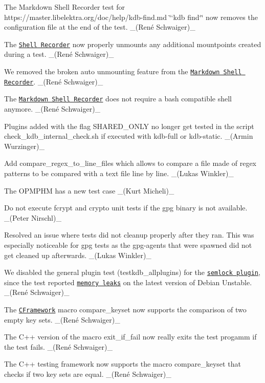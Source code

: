 \begin{DoxyItemize}
\item The Markdown Shell Recorder test for https\+://master.libelektra.\+org/doc/help/kdb-\/find.md \char`\"{}`kdb find`\char`\"{} now removes the configuration file at the end of the test. \+\_\+(René Schwaiger)\+\_\+
\item The \href{(https://master.libelektra.org/tests/shell/shell_recorder)}{\tt Shell Recorder} now properly unmounts any additional mountpoints created during a test. \+\_\+(René Schwaiger)\+\_\+
\item We removed the broken auto unmounting feature from the \href{https://master.libelektra.org/tests/shell/shell_recorder/tutorial_wrapper}{\tt Markdown Shell Recorder}. \+\_\+(René Schwaiger)\+\_\+
\item The \href{https://master.libelektra.org/tests/shell/shell_recorder/tutorial_wrapper}{\tt Markdown Shell Recorder} does not require a {\ttfamily bash} compatible shell anymore. \+\_\+(René Schwaiger)\+\_\+
\end{DoxyItemize}


\begin{DoxyItemize}
\item Plugins added with the flag {\ttfamily S\+H\+A\+R\+E\+D\+\_\+\+O\+N\+LY} no longer get tested in the script {\ttfamily check\+\_\+kdb\+\_\+internal\+\_\+check.\+sh} if executed with kdb-\/full or kdb-\/static. \+\_\+(\+Armin Wurzinger)\+\_\+
\item Add {\ttfamily compare\+\_\+regex\+\_\+to\+\_\+line\+\_\+files} which allows to compare a file made of regex patterns to be compared with a text file line by line. \+\_\+(\+Lukas Winkler)\+\_\+
\item The O\+P\+M\+P\+HM has a new test case \+\_\+(\+Kurt Micheli)\+\_\+
\item Do not execute {\ttfamily fcrypt} and {\ttfamily crypto} unit tests if the {\ttfamily gpg} binary is not available. \+\_\+(\+Peter Nirschl)\+\_\+
\item Resolved an issue where tests did not cleanup properly after they ran. This was especially noticeable for {\ttfamily gpg} tests as the {\ttfamily gpg-\/agents} that were spawned did not get cleaned up afterwards. \+\_\+(\+Lukas Winkler)\+\_\+
\item We disabled the general plugin test ({\ttfamily testkdb\+\_\+allplugins}) for the \href{https://libelektra.org/plugins/mini}{\tt {\ttfamily semlock} plugin}, since the test reported \href{https://issues.libelektra.org/2113}{\tt memory leaks} on the latest version of Debian Unstable. \+\_\+(René Schwaiger)\+\_\+
\item The \href{https://master.libelektra.org/tests/cframework}{\tt C\+Framework} macro {\ttfamily compare\+\_\+keyset} now supports the comparison of two empty key sets. \+\_\+(René Schwaiger)\+\_\+
\item The C++ version of the macro {\ttfamily exit\+\_\+if\+\_\+fail} now really exits the test progamm if the test fails. \+\_\+(René Schwaiger)\+\_\+
\item The C++ testing framework now supports the macro {\ttfamily compare\+\_\+keyset} that checks if two key sets are equal. \+\_\+(René Schwaiger)\+\_\+
\end{DoxyItemize}

